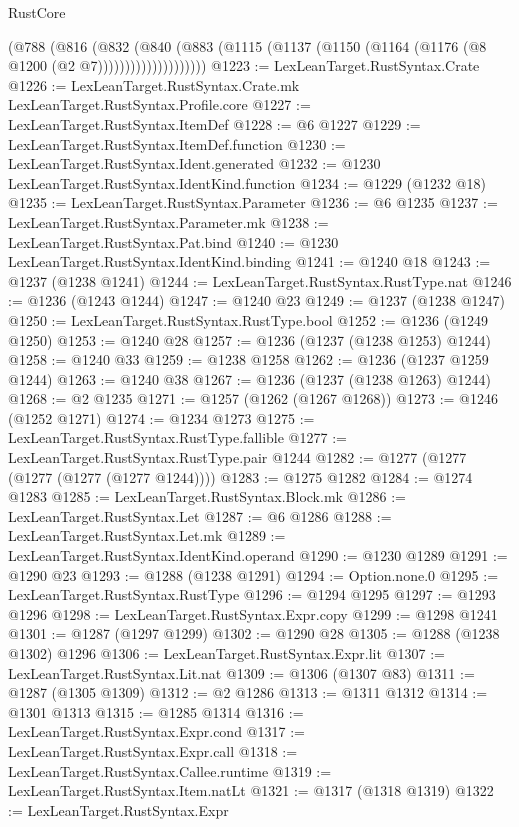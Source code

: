 \begin{lexlean}{RustCore}
\begin{coremodule}
                    (@788
                      (@816
                        (@832
                          (@840
                            (@883
                              (@1115
                                (@1137 (@1150 (@1164 (@1176 (@8 @1200 (@2 @7))))))))))))))))))))
@1223 := LexLeanTarget.RustSyntax.Crate
@1226 := LexLeanTarget.RustSyntax.Crate.mk LexLeanTarget.RustSyntax.Profile.core
@1227 := LexLeanTarget.RustSyntax.ItemDef
@1228 := @6 @1227
@1229 := LexLeanTarget.RustSyntax.ItemDef.function
@1230 := LexLeanTarget.RustSyntax.Ident.generated
@1232 := @1230 LexLeanTarget.RustSyntax.IdentKind.function
@1234 := @1229 (@1232 @18)
@1235 := LexLeanTarget.RustSyntax.Parameter
@1236 := @6 @1235
@1237 := LexLeanTarget.RustSyntax.Parameter.mk
@1238 := LexLeanTarget.RustSyntax.Pat.bind
@1240 := @1230 LexLeanTarget.RustSyntax.IdentKind.binding
@1241 := @1240 @18
@1243 := @1237 (@1238 @1241)
@1244 := LexLeanTarget.RustSyntax.RustType.nat
@1246 := @1236 (@1243 @1244)
@1247 := @1240 @23
@1249 := @1237 (@1238 @1247)
@1250 := LexLeanTarget.RustSyntax.RustType.bool
@1252 := @1236 (@1249 @1250)
@1253 := @1240 @28
@1257 := @1236 (@1237 (@1238 @1253) @1244)
@1258 := @1240 @33
@1259 := @1238 @1258
@1262 := @1236 (@1237 @1259 @1244)
@1263 := @1240 @38
@1267 := @1236 (@1237 (@1238 @1263) @1244)
@1268 := @2 @1235
@1271 := @1257 (@1262 (@1267 @1268))
@1273 := @1246 (@1252 @1271)
@1274 := @1234 @1273
@1275 := LexLeanTarget.RustSyntax.RustType.fallible
@1277 := LexLeanTarget.RustSyntax.RustType.pair @1244
@1282 := @1277 (@1277 (@1277 (@1277 (@1277 @1244))))
@1283 := @1275 @1282
@1284 := @1274 @1283
@1285 := LexLeanTarget.RustSyntax.Block.mk
@1286 := LexLeanTarget.RustSyntax.Let
@1287 := @6 @1286
@1288 := LexLeanTarget.RustSyntax.Let.mk
@1289 := LexLeanTarget.RustSyntax.IdentKind.operand
@1290 := @1230 @1289
@1291 := @1290 @23
@1293 := @1288 (@1238 @1291)
@1294 := Option.none.{0}
@1295 := LexLeanTarget.RustSyntax.RustType
@1296 := @1294 @1295
@1297 := @1293 @1296
@1298 := LexLeanTarget.RustSyntax.Expr.copy
@1299 := @1298 @1241
@1301 := @1287 (@1297 @1299)
@1302 := @1290 @28
@1305 := @1288 (@1238 @1302) @1296
@1306 := LexLeanTarget.RustSyntax.Expr.lit
@1307 := LexLeanTarget.RustSyntax.Lit.nat
@1309 := @1306 (@1307 @83)
@1311 := @1287 (@1305 @1309)
@1312 := @2 @1286
@1313 := @1311 @1312
@1314 := @1301 @1313
@1315 := @1285 @1314
@1316 := LexLeanTarget.RustSyntax.Expr.cond
@1317 := LexLeanTarget.RustSyntax.Expr.call
@1318 := LexLeanTarget.RustSyntax.Callee.runtime
@1319 := LexLeanTarget.RustSyntax.Item.natLt
@1321 := @1317 (@1318 @1319)
@1322 := LexLeanTarget.RustSyntax.Expr

\end{coremodule}
\end{lexlean}
